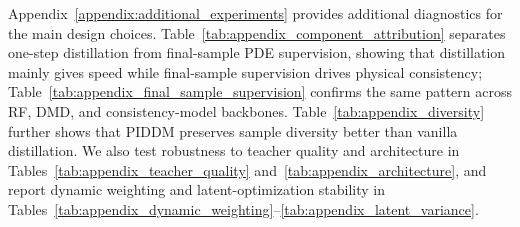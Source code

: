 \documentclass{article}
\theoremstyle{plain}
\theoremstyle{definition}
\theoremstyle{remark}
\begin{document}
Appendix~\ref{appendix:additional_experiments} provides additional diagnostics for the main design choices. Table~\ref{tab:appendix_component_attribution} separates one-step distillation from final-sample PDE supervision, showing that distillation mainly gives speed while final-sample supervision drives physical consistency; Table~\ref{tab:appendix_final_sample_supervision} confirms the same pattern across RF, DMD, and consistency-model backbones. Table~\ref{tab:appendix_diversity} further shows that PIDDM preserves sample diversity better than vanilla distillation. We also test robustness to teacher quality and architecture in Tables~\ref{tab:appendix_teacher_quality} and~\ref{tab:appendix_architecture}, and report dynamic weighting and latent-optimization stability in Tables~\ref{tab:appendix_dynamic_weighting}--\ref{tab:appendix_latent_variance}.




\end{document}

